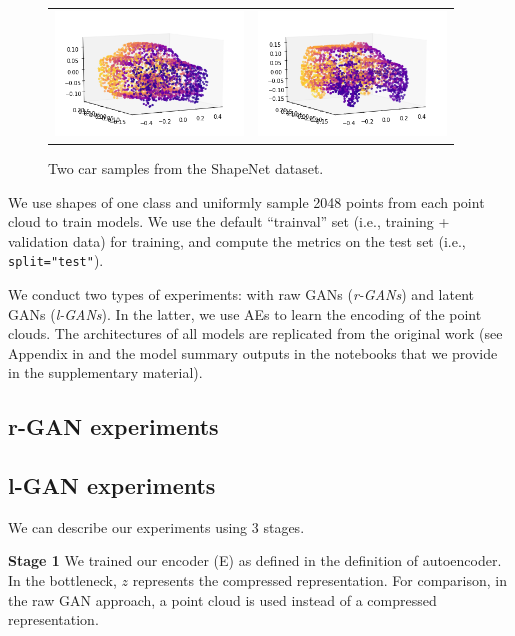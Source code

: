 \documentclass[12pt]{article}
\begin{document}
    \begin{figure}
        \centering
        \begin{tabular}{cc}
            \includegraphics[width = 50mm]{car-shapenet-1} &
            \includegraphics[width = 50mm]{car-shapenet-2} \\
        \end{tabular}
        \caption{Two car samples from the ShapeNet dataset.}
        \label{figure:cars_from_shapenet}
    \end{figure}

    We use shapes of one class and uniformly sample 2048 points from each point cloud to train models. We use the default ``trainval'' set (i.e., training + validation data) for training, and compute the metrics on the test set (i.e., \verb|split="test"|).

    We conduct two types of experiments: with raw GANs (\textit{r-GANs}) and latent GANs (\textit{l-GANs}). In the latter, we use AEs to learn the encoding of the point clouds. The architectures of all models are replicated from the original work (see Appendix in \cite{pmlr-v80-achlioptas18a} and the model summary outputs in the notebooks that we provide in the supplementary material).

    \subsection{r-GAN experiments}

    \subsection{l-GAN experiments}

    We can describe our experiments using 3 stages.

    \textbf{Stage 1}
    We trained our encoder (E) as defined in the definition of autoencoder.
    In the bottleneck, $z$ represents the compressed representation.
    For comparison, in the raw GAN approach, a point cloud is used instead of a compressed representation.
\end{document}
